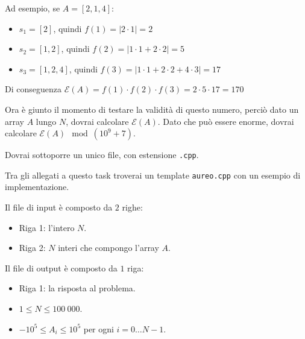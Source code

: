 Ad esempio, se $A = [2,1,4]$:
\begin{itemize}
    \item $s_1 = [2]$, quindi $f(1) = |2\cdot 1 |= 2$
    \item $s_2 = [1,2]$, quindi $f(2) = |1\cdot 1 + 2\cdot 2| = 5$
    \item $s_3 = [1,2,4]$, quindi $f(3) = |1\cdot 1 + 2\cdot 2 + 4\cdot 3|= 17$
\end{itemize}

Di conseguenza $\mathcal{E}(A) = f(1) \cdot f(2) \cdot f(3) = 2 \cdot 5 \cdot 17 = 170$

Ora è giunto il momento di testare la validità di questo numero, perciò dato un array $A$ lungo $N$,
dovrai calcolare $\mathcal{E}(A)$. Dato che può essere enorme, dovrai calcolare $\mathcal{E}(A)\mod (10^9+7)$.


\Implementation

Dovrai sottoporre un unico file, con estensione \texttt{.cpp}.

\begin{warning}
    Tra gli allegati a questo task troverai un template \texttt{aureo.cpp} con un esempio di implementazione.
\end{warning}

Il file di input è composto da $2$ righe:
\begin{itemize}
    \item Riga 1: l'intero $N$.
    \item Riga 2: $N$ interi che compongo l'array $A$.
\end{itemize}

Il file di output è composto da $1$ riga:
\begin{itemize}
    \item Riga 1: la risposta al problema.
\end{itemize}


\Constraints

\begin{itemize}[nolistsep, itemsep=2mm]
    \item $1 \le N \le 100\:000$.
    \item $-10^5 \le A_i \le 10^5$ per ogni $i = 0 \dots N-1$.
\end{itemize}


